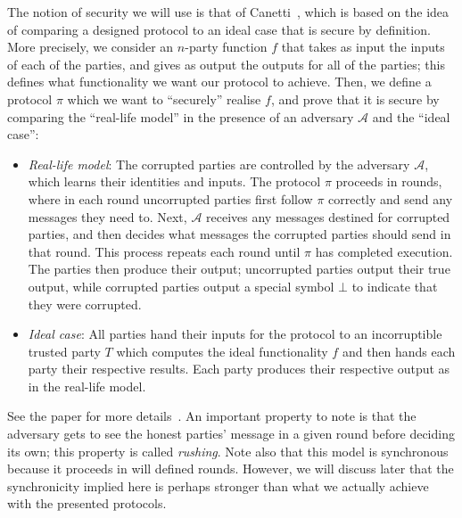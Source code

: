 \documentclass{article}
\theoremstyle{remark}
\begin{document}
The notion of security we will use is that of Canetti~\cite{canetti_2000},
which is based on the idea of comparing a designed protocol to an ideal case
that is secure by definition. More precisely, we consider an $n$-party function
$f$ that takes as input the inputs of each of the parties, and gives as output
the outputs for all of the parties; this defines what functionality we want our
protocol to achieve. Then, we define a protocol $\pi$ which we want to
``securely'' realise $f$, and prove that it is secure by comparing the
``real-life model'' in the presence of an adversary $\mathcal{A}$ and the
``ideal case'':
\begin{itemize}
	\item \textit{Real-life model}: The corrupted parties are controlled by the
		adversary $\mathcal{A}$, which learns their identities and inputs. The
		protocol $\pi$ proceeds in rounds, where in each round uncorrupted
		parties first follow $\pi$ correctly and send any messages they need
		to. Next, $\mathcal{A}$ receives any messages destined for corrupted
		parties, and then decides what messages the corrupted parties should
		send in that round. This process repeats each round until $\pi$ has
		completed execution. The parties then produce their output; uncorrupted
		parties output their true output, while corrupted parties output a
		special symbol $\bot$ to indicate that they were corrupted.

	\item \textit{Ideal case}: All parties hand their inputs for the protocol
		to an incorruptible trusted party $T$ which computes the ideal
		functionality $f$ and then hands each party their respective results.
		Each party produces their respective output as in the real-life model.
\end{itemize}
See the paper for more details~\cite{canetti_2000}. An important property to
note is that the adversary gets to see the honest parties' message in a given
round before deciding its own; this property is called \textit{rushing}. Note
also that this model is synchronous because it proceeds in will defined rounds.
However, we will discuss later that the synchronicity implied here is perhaps
stronger than what we actually achieve with the presented protocols.
\end{document}
